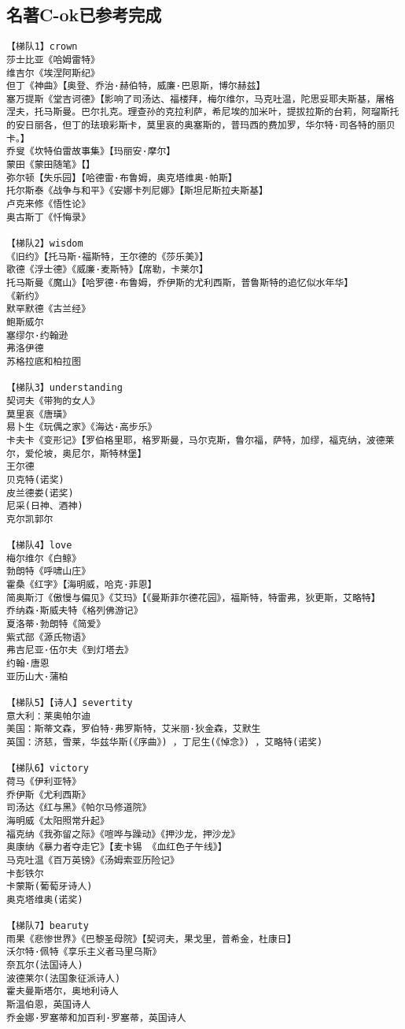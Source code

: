\documentclass[UTF8]{../../RepresentationUniverse}
\begin{document}
\subsection{名著C-ok已参考完成}

\begin{lstlisting}
【梯队1】crown
莎士比亚《哈姆雷特》
维吉尔《埃涅阿斯纪》
但丁《神曲》【奥登、乔治·赫伯特，威廉·巴恩斯，博尔赫兹】
塞万提斯《堂吉诃德》【影响了司汤达、福楼拜，梅尔维尔，马克吐温，陀思妥耶夫斯基，屠格涅夫，托马斯曼。巴尔扎克。理查孙的克拉利萨，希尼埃的加米叶，提拔拉斯的台莉，阿瑠斯托的安日丽各，但丁的珐琅彩斯卡，莫里哀的奥塞斯的，普玛西的费加罗，华尔特·司各特的丽贝卡。】
乔叟《坎特伯雷故事集》【玛丽安·摩尔】
蒙田《蒙田随笔》【】
弥尔顿【失乐园】【哈德雷·布鲁姆，奥克塔维奥·帕斯】
托尔斯泰《战争与和平》《安娜卡列尼娜》【斯坦尼斯拉夫斯基】
卢克来修《悟性论》
奥古斯丁《忏悔录》

【梯队2】wisdom
《旧约》【托马斯·福斯特，王尔德的《莎乐美》】
歌德《浮士德》《威廉·麦斯特》【席勒，卡莱尔】
托马斯曼《魔山》【哈罗德·布鲁姆，乔伊斯的尤利西斯，普鲁斯特的追忆似水年华】
《新约》
默罕默德《古兰经》
鲍斯威尔
塞缪尔·约翰逊
弗洛伊德
苏格拉底和柏拉图

【梯队3】understanding
契诃夫《带狗的女人》
莫里哀《唐璜》
易卜生《玩偶之家》《海达·高步乐》
卡夫卡《变形记》【罗伯格里耶，格罗斯曼，马尔克斯，鲁尔福，萨特，加缪，福克纳，波德莱尔，爱伦坡，奥尼尔，斯特林堡】
王尔德
贝克特(诺奖) 
皮兰德娄(诺奖) 
尼采(日神、酒神) 
克尔凯郭尔

【梯队4】love
梅尔维尔《白鲸》
勃朗特《呼啸山庄》
霍桑《红字》【海明威，哈克·菲恩】
简奥斯汀《傲慢与偏见》《艾玛》【《曼斯菲尔德花园》，福斯特，特雷弗，狄更斯，艾略特】
乔纳森·斯威夫特《格列佛游记》
夏洛蒂·勃朗特《简爱》
紫式部《源氏物语》
弗吉尼亚·伍尔夫《到灯塔去》
约翰·唐恩
亚历山大·蒲柏

【梯队5】【诗人】severtity
意大利：莱奥帕尔迪
美国：斯蒂文森，罗伯特·弗罗斯特，艾米丽·狄金森，艾默生
英国：济慈，雪莱，华兹华斯(《序曲》) ，丁尼生(《悼念》) ，艾略特(诺奖) 

【梯队6】victory
荷马《伊利亚特》
乔伊斯《尤利西斯》
司汤达《红与黑》《帕尔马修道院》
海明威《太阳照常升起》
福克纳《我弥留之际》《喧哗与躁动》《押沙龙，押沙龙》
奥康纳《暴力者夺走它》【麦卡锡 《血红色子午线》】
马克吐温《百万英镑》《汤姆索亚历险记》
卡彭铁尔
卡蒙斯(葡萄牙诗人) 
奥克塔维奥(诺奖) 

【梯队7】bearuty
雨果《悲惨世界》《巴黎圣母院》【契诃夫，果戈里，普希金，杜康日】
沃尔特·佩特《享乐主义者马里乌斯》
奈瓦尔(法国诗人) 
波德莱尔(法国象征派诗人) 
霍夫曼斯塔尔，奥地利诗人
斯温伯恩，英国诗人
乔金娜·罗塞蒂和加百利·罗塞蒂，英国诗人


\end{lstlisting}
\end{document}
